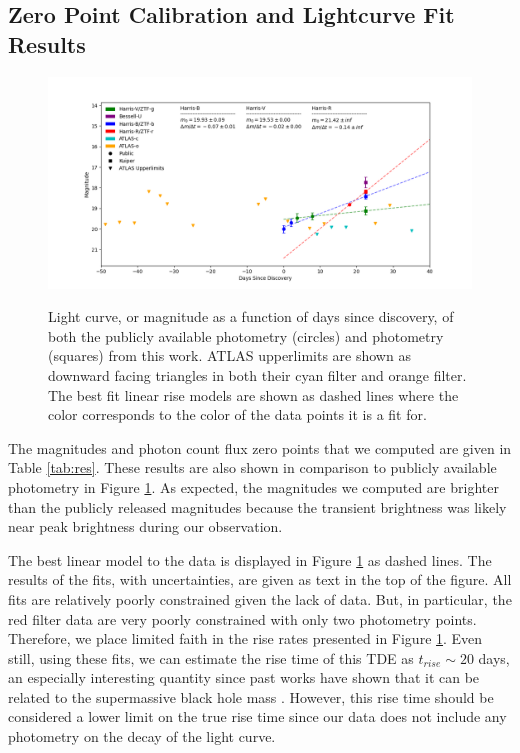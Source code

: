 \documentclass{aastex631}
\begin{document}
\subsection{Zero Point Calibration and Lightcurve Fit Results}
\begin{figure}
  \includegraphics[width=\textwidth]{../analysis/lightcurve.png}
  \label{fig:lc}
  \caption{Light curve, or magnitude as a function of days since discovery, of both the publicly available photometry (circles) and photometry (squares) from this work. ATLAS upperlimits are shown as downward facing triangles in both their cyan filter and orange filter. The best fit linear rise models are shown as dashed lines where the color corresponds to the color of the data points it is a fit for.}
\end{figure}

The magnitudes and photon count flux zero points that we computed are given in Table \ref{tab:res}. These results are also shown in comparison to publicly available photometry in Figure \ref{fig:lc}. As expected, the magnitudes we computed are brighter than the publicly released magnitudes because the transient brightness was likely near peak brightness during our observation.

The best linear model to the data is displayed in Figure \ref{fig:lc} as dashed lines. The results of the fits, with uncertainties, are given as text in the top of the figure. All fits are relatively poorly constrained given the lack of data. But, in particular, the red filter data are very poorly constrained with only two photometry points. Therefore, we place limited faith in the rise rates presented in Figure \ref{fig:lc}. Even still, using these fits, we can estimate the rise time of this TDE as $t_{rise} \sim 20$ days, an especially interesting quantity since past works have shown that it can be related to the supermassive black hole mass \citep{vanVelzen2021}. However, this rise time should be considered a lower limit on the true rise time since our data does not include any photometry on the decay of the light curve.
\end{document}
